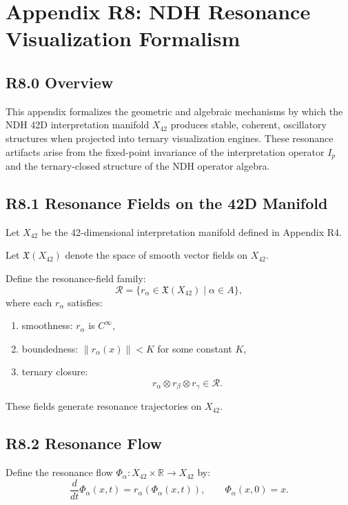 \appendix
\section*{Appendix R8: NDH Resonance Visualization Formalism}

\subsection*{R8.0 Overview}

This appendix formalizes the geometric and algebraic mechanisms by which
the NDH 42D interpretation manifold $X_{42}$ produces stable, coherent,
oscillatory structures when projected into ternary visualization engines.
These resonance artifacts arise from the fixed-point invariance of the
interpretation operator $I_p$ and the ternary-closed structure of the
NDH operator algebra.

\subsection*{R8.1 Resonance Fields on the 42D Manifold}

Let $X_{42}$ be the 42-dimensional interpretation manifold defined in
Appendix R4.

Let $\mathfrak{X}(X_{42})$ denote the space of smooth vector fields on
$X_{42}$.

Define the resonance-field family:
\[
\mathcal{R} = \{ r_{\alpha} \in \mathfrak{X}(X_{42}) \mid \alpha \in A \},
\]
where each $r_{\alpha}$ satisfies:

\begin{enumerate}
    \item smoothness: $r_{\alpha}$ is $C^\infty$,
    \item boundedness: $\|r_{\alpha}(x)\| < K$ for some constant $K$,
    \item ternary closure:
    \[
    r_{\alpha} \otimes r_{\beta} \otimes r_{\gamma} \in \mathcal{R}.
    \]
\end{enumerate}

These fields generate resonance trajectories on $X_{42}$.

\subsection*{R8.2 Resonance Flow}

Define the resonance flow $\Phi_{\alpha} : X_{42} \times \mathbb{R} \to X_{42}$ by:
\[
\frac{d}{dt} \Phi_{\alpha}(x,t) = r_{\alpha}(\Phi_{\alpha}(x,t)),
\qquad \Phi_{\alpha}(x,0) = x.
\]

